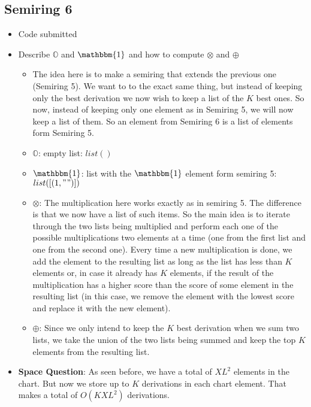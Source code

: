 \documentclass{article}
\begin{document}
\begin{spacing}{1.1}
\subsection{Semiring 6}
\begin{itemize}
	\item Code submitted
	\item Describe $\mathbb{O}$ and $\mathbbm{1}$ and how to compute $\otimes$ and $\oplus$
	\begin{itemize}
		\item The idea here is to make a semiring that extends the previous one (Semiring 5). We want to to the exact same thing, but instead of keeping only the best derivation we now wish to keep a list of the $K$ best ones. So now, instead of keeping only one element as in Semiring 5, we will now keep a list of them. So an element from Semiring 6 is a list of elements form Semiring 5.
		\item $\mathbb{O}$: empty list: $list()$
		\item $\mathbbm{1}$:  list with the $\mathbbm{1}$ element form semiring 5: $list( [(1,"")] )$
		\item $\otimes$: The multiplication here works exactly as in semiring 5. The difference is that we now have a list of such items. So the main idea is to iterate through the two lists being multiplied and perform each one of the possible multiplications two elements at a time (one from the first list and one from the second one). Every time a new multiplication is done, we add the element to the resulting list as long as the list has less than $K$ elements or, in case it already has $K$ elements, if the result of the multiplication has a higher score than the score of some element in the resulting list (in this case, we remove the element with the lowest score and replace it with the new element).
		\item $\oplus$: Since we only intend to keep the $K$ best derivation when we sum two lists, we take the union of the two lists being summed and keep the top $K$ elements from the resulting list.
	\end{itemize}
	\item {\bf Space Question}: As seen before, we have a total of $XL^2$ elements in the chart. But now we store up to $K$ derivations in each chart element. That makes a total of $O(KXL^2)$ derivations.
\end{itemize}


\end{spacing}
\end{document}
